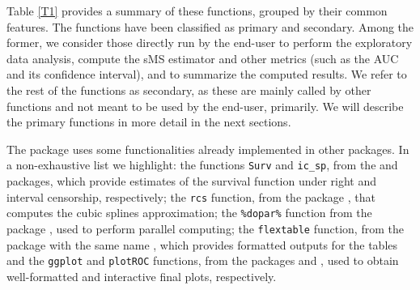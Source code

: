 Table \ref{T1}  provides a summary of these functions, grouped by their common features. The functions have been classified as primary and secondary. Among the former, we consider those directly run by the end-user to perform the exploratory data analysis, compute the sMS estimator and other metrics (such as the AUC and its confidence interval), and to summarize the computed results. We refer to the rest of the functions as secondary, as these are mainly called by other functions and not meant to be used by the end-user, primarily. We will describe the primary functions in more detail in the next sections.

The   package uses some functionalities already implemented in other packages. In a non-exhaustive list we highlight: the functions \texttt{Surv} and \texttt{ic\_sp}, from the  \citep{survival} and   \citep{icenReg} packages, which provide estimates of the survival function under right and interval censorship, respectively; the \texttt{rcs} function, from the   package \citep{rms}, that computes the cubic splines approximation; the  \texttt{\%dopar\%} function from the package  \citep{foreach}, used to perform parallel computing;  the \texttt{flextable} function, from the package with the same name  \citep{flextable}, which provides formatted outputs for the tables and the \texttt{ggplot} and  \texttt{plotROC} functions, from the  packages  \citep{ggplot2} and  \citep{Sachs2017}, used to obtain well-formatted and interactive final plots, respectively.

